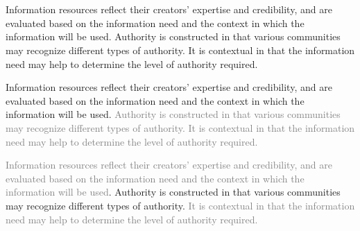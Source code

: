 \documentclass[17pt]{extarticle}
\begin{document}
{\Huge

\begin{center}

   \\
  \vspace{1in}
   \\
  \vspace{1in}

\end{center}

\newpage


{\Huge

  \begin{center}

    Information resources reflect their creators’ expertise and credibility, and are evaluated based on the information need and the context in which the information will be used. Authority is constructed in that various communities may recognize different types of authority. It is contextual in that the information need may help to determine the level of authority required.

\end{center}

}

\newpage


{\Huge

  \begin{center}

    Information resources reflect their creators’ expertise and credibility, and are evaluated based on the information need and the context in which the information will be used. \textcolor{gray}{Authority is constructed in that various communities may recognize different types of authority. It is contextual in that the information need may help to determine the level of authority required.}

\end{center}

}

\newpage


{\Huge

  \begin{center}

    \textcolor{gray}{Information resources reflect their creators’ expertise and credibility, and are evaluated based on the information need and the context in which the information will be used}. Authority is constructed in that various communities may recognize different types of authority. \textcolor{gray}{It is contextual in that the information need may help to determine the level of authority required.}


\end{center}}}
\end{document}

